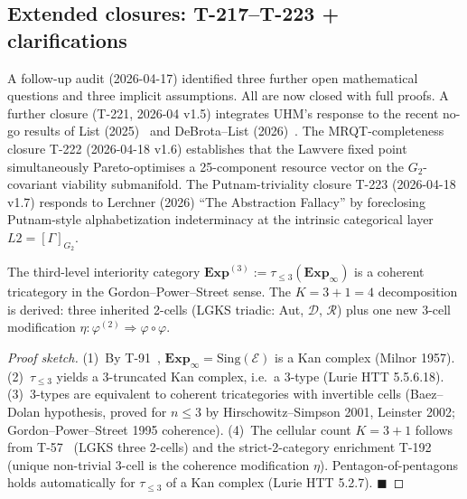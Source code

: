 \subsection{Extended closures: T-217--T-223 + clarifications}
\label{subsec:extended-closures}

A follow-up audit (2026-04-17) identified three further open
mathematical questions and three implicit assumptions. All are now
closed with full proofs. A further closure (T-221, 2026-04 v1.5)
integrates UHM's response to the recent no-go results of List
(2025)~\citep{list2025quadrilemma} and DeBrota--List
(2026)~\citep{debrota2026heptalemma,debrotalist2026preprint}. The
MRQT-completeness closure T-222 (2026-04-18 v1.6) establishes that
the Lawvere fixed point simultaneously Pareto-optimises a
25-component resource vector on the $G_2$-covariant viability
submanifold. The Putnam-triviality closure T-223 (2026-04-18 v1.7)
responds to Lerchner (2026) ``The Abstraction Fallacy'' by
foreclosing Putnam-style alphabetization indeterminacy at the
intrinsic categorical layer $L2 = [\Gamma]_{G_2}$.

\begin{theorembox}
\label{thm:t217-l3-tricat}
The third-level interiority category $\mathbf{Exp}^{(3)} :=
\tau_{\leq 3}(\mathbf{Exp}_\infty)$ is a coherent tricategory in the
Gordon--Power--Street sense. The $K = 3 + 1 = 4$ decomposition is
derived: three inherited 2-cells (LGKS triadic: Aut, $\mathcal D$,
$\mathcal R$) plus one new 3-cell modification
$\eta : \varphi^{(2)} \Rightarrow \varphi \circ \varphi$.
\end{theorembox}

\begin{proof}[Proof sketch]
(1)~By T-91~, $\mathbf{Exp}_\infty = \mathrm{Sing}(\mathcal E)$
is a Kan complex (Milnor 1957). (2)~$\tau_{\leq 3}$ yields a 3-truncated
Kan complex, i.e.~a 3-type (Lurie HTT 5.5.6.18). (3)~3-types are
equivalent to coherent tricategories with invertible cells
(Baez--Dolan hypothesis, proved for $n \leq 3$ by Hirschowitz--Simpson
2001, Leinster 2002; Gordon--Power--Street 1995 coherence).
(4)~The cellular count $K = 3 + 1$ follows from T-57~ (LGKS
three 2-cells) and the strict-2-category enrichment T-192~
(unique non-trivial 3-cell is the coherence modification $\eta$).
Pentagon-of-pentagons holds automatically for $\tau_{\leq 3}$ of a Kan
complex (Lurie HTT 5.2.7). $\blacksquare$
\end{proof}

